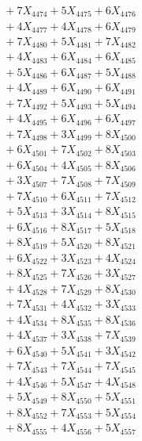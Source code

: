 \documentclass[a4paper,10pt]{article}
\begin{document}
{\begin{align}
&\;  + 7 X_{4474} + 5 X_{4475} + 6 X_{4476} \\[0.3ex]
&\;  + 4 X_{4477} + 4 X_{4478} + 6 X_{4479} \\[0.5ex]\allowbreak
&\;  + 7 X_{4480} + 5 X_{4481} + 7 X_{4482} \\[0.3ex]
&\;  + 4 X_{4483} + 6 X_{4484} + 6 X_{4485} \\[0.3ex]
&\;  + 5 X_{4486} + 6 X_{4487} + 5 X_{4488} \\[0.3ex]
&\;  + 4 X_{4489} + 6 X_{4490} + 6 X_{4491} \\[0.3ex]
&\;  + 7 X_{4492} + 5 X_{4493} + 5 X_{4494} \\[0.3ex]
&\;  + 4 X_{4495} + 6 X_{4496} + 6 X_{4497} \\[0.3ex]
&\;  + 7 X_{4498} + 3 X_{4499} + 8 X_{4500} \\[0.3ex]
&\;  + 6 X_{4501} + 7 X_{4502} + 8 X_{4503} \\[0.3ex]
&\;  + 6 X_{4504} + 4 X_{4505} + 8 X_{4506} \\[0.3ex]
&\;  + 3 X_{4507} + 7 X_{4508} + 7 X_{4509} \\[0.5ex]\allowbreak
&\;  + 7 X_{4510} + 6 X_{4511} + 7 X_{4512} \\[0.3ex]
&\;  + 5 X_{4513} + 3 X_{4514} + 8 X_{4515} \\[0.3ex]
&\;  + 6 X_{4516} + 8 X_{4517} + 5 X_{4518} \\[0.3ex]
&\;  + 8 X_{4519} + 5 X_{4520} + 8 X_{4521} \\[0.3ex]
&\;  + 6 X_{4522} + 3 X_{4523} + 4 X_{4524} \\[0.3ex]
&\;  + 8 X_{4525} + 7 X_{4526} + 3 X_{4527} \\[0.3ex]
&\;  + 4 X_{4528} + 7 X_{4529} + 8 X_{4530} \\[0.3ex]
&\;  + 7 X_{4531} + 4 X_{4532} + 3 X_{4533} \\[0.3ex]
&\;  + 4 X_{4534} + 8 X_{4535} + 8 X_{4536} \\[0.3ex]
&\;  + 4 X_{4537} + 3 X_{4538} + 7 X_{4539} \\[0.5ex]\allowbreak
&\;  + 6 X_{4540} + 5 X_{4541} + 3 X_{4542} \\[0.3ex]
&\;  + 7 X_{4543} + 7 X_{4544} + 7 X_{4545} \\[0.3ex]
&\;  + 4 X_{4546} + 5 X_{4547} + 4 X_{4548} \\[0.3ex]
&\;  + 5 X_{4549} + 8 X_{4550} + 5 X_{4551} \\[0.3ex]
&\;  + 8 X_{4552} + 7 X_{4553} + 5 X_{4554} \\[0.3ex]
&\;  + 8 X_{4555} + 4 X_{4556} + 5 X_{4557} \\[0.3ex]

\end{align}}
\end{document}
